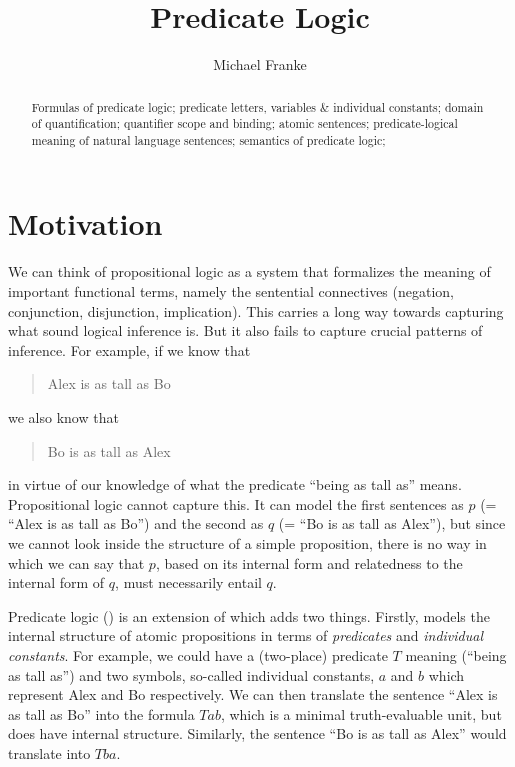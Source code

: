 \documentclass[nobib,nofonts]{tufte-handout}
\title{Predicate Logic}
\author[M.~Franke]{Michael Franke}
\date{} %
\newcommand{\proplog}{\acro{PropLog}}
\newcommand{\predlog}{\acro{PredLog}}
\begin{document}
\maketitle

\begin{abstract}
\noindent
Formulas of predicate logic;
predicate letters, variables \& individual constants;
domain of quantification;
quantifier scope and binding;
atomic sentences;
predicate-logical meaning of natural language sentences;
semantics of predicate logic;
\end{abstract}

\section{Motivation}

We can think of propositional logic as a system that formalizes the meaning of important functional terms, namely the sentential connectives (negation, conjunction, disjunction, implication).
This carries a long way towards capturing what sound logical inference is.
But it also fails to capture crucial patterns of inference.
For example, if we know that
\begin{quote}
  Alex is as tall as Bo
\end{quote}
we also know that
\begin{quote}
  Bo is as tall as Alex
\end{quote}
in virtue of our knowledge of what the predicate ``being as tall as'' means.
Propositional logic cannot capture this.
It can model the first sentences as $p$ (= ``Alex is as tall as Bo'') and the second as $q$ (= ``Bo is as tall as Alex''), but since we cannot look inside the structure of a simple proposition, there is no way in which we can say that $p$, based on its internal form and relatedness to the internal form of $q$, must necessarily entail $q$.

Predicate logic (\predlog) is an extension of \proplog which adds two things.
Firstly, \predlog models the internal structure of atomic propositions in terms of \emph{predicates} and \emph{individual constants}.
For example, we could have a (two-place) predicate $T$ meaning (``being as tall as'') and two symbols, so-called individual constants, $a$ and $b$ which represent Alex and Bo respectively.
We can then translate the sentence ``Alex is as tall as Bo'' into the formula $Tab$, which is a minimal truth-evaluable unit, but does have internal structure.
Similarly, the sentence ``Bo is as tall as Alex'' would translate into $Tba$.
\end{document}
